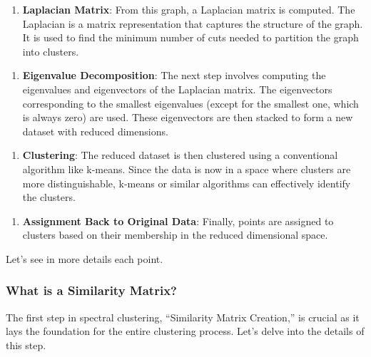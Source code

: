 \documentclass[11pt]{article}
\providecommand{\tightlist}{%
      \setlength{\itemsep}{0pt}\setlength{\parskip}{0pt}}
\begin{document}
    \begin{enumerate}
\def\labelenumi{\arabic{enumi}.}
\setcounter{enumi}{2}
\tightlist
\item
  \textbf{Laplacian Matrix}: From this graph, a Laplacian matrix is
  computed. The Laplacian is a matrix representation that captures the
  structure of the graph. It is used to find the minimum number of cuts
  needed to partition the graph into clusters.
\end{enumerate}

    \begin{enumerate}
\def\labelenumi{\arabic{enumi}.}
\setcounter{enumi}{3}
\tightlist
\item
  \textbf{Eigenvalue Decomposition}: The next step involves computing
  the eigenvalues and eigenvectors of the Laplacian matrix. The
  eigenvectors corresponding to the smallest eigenvalues (except for the
  smallest one, which is always zero) are used. These eigenvectors are
  then stacked to form a new dataset with reduced dimensions.
\end{enumerate}

    \begin{enumerate}
\def\labelenumi{\arabic{enumi}.}
\setcounter{enumi}{4}
\tightlist
\item
  \textbf{Clustering}: The reduced dataset is then clustered using a
  conventional algorithm like k-means. Since the data is now in a space
  where clusters are more distinguishable, k-means or similar algorithms
  can effectively identify the clusters.
\end{enumerate}

    \begin{enumerate}
\def\labelenumi{\arabic{enumi}.}
\setcounter{enumi}{5}
\tightlist
\item
  \textbf{Assignment Back to Original Data}: Finally, points are
  assigned to clusters based on their membership in the reduced
  dimensional space.
\end{enumerate}

Let's see in more details each point.

    \subsubsection{What is a Similarity
Matrix?}\label{what-is-a-similarity-matrix}

The first step in spectral clustering, ``Similarity Matrix Creation,''
is crucial as it lays the foundation for the entire clustering process.
Let's delve into the details of this step.
\end{document}
